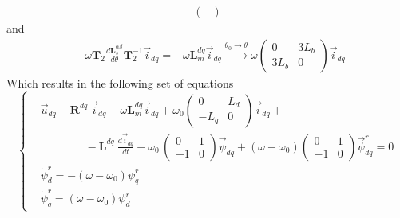 \documentclass[12pt,a4paper,oneside]{book}
\begin{document}
\begin{onehalfspace}
\begin{equation}
\begin{aligned}
\begin{pmatrix}
		\end{pmatrix}
	\end{aligned}
\end{equation}
and
\begin{equation}
	\begin{aligned}
		&-\omega\mathbf{T}_2\frac{d\mathbf{L}_s^{\alpha\beta}}{d\theta}\mathbf{T}_2^{-1}\vec{i}_{dq}
		= -\omega\mathbf{L}_m^{dq}\vec{i}_{dq}
		\xrightarrow{\theta_0\rightarrow\theta} \omega\begin{pmatrix} 0 & 
			3L_b\\ 3L_b & 0 \end{pmatrix}\vec{i}_{dq}\		
	\end{aligned}
\end{equation}
Which results in the following set of equations
\begin{equation*}
	\left\lbrace \begin{aligned}
		& \vec{u}_{dq}-\mathbf{R}^{dq}\ \vec{i}_{dq} 
		-\omega\mathbf{L}_m^{dq}\vec{i}_{dq} + \omega_0\begin{pmatrix} 0 & 
			L_d\\ -L_q & 0 \end{pmatrix}\vec{i}_{dq} + \\[6pt] 
		&\qquad\qquad-\mathbf{L}^{dq}\ \frac{d\vec{i}_{dq}}{dt} + 
		\omega_0\,\begin{pmatrix} 0 & 1\\ -1 & 0 
		\end{pmatrix}\vec{\psi}_{dq} + (\omega - \omega_0)\begin{pmatrix} 0 
			& 1\\ -1 & 0 \end{pmatrix}\vec{\psi}_{dq}^r = 0\\[6pt]
		& \dot{\psi}_d^r = -\left( \omega-\omega_0\right)\psi_q^r \\[6pt]
		&\dot{\psi}_q^r = \left( \omega-\omega_0\right)\psi_d^r

\end{aligned}
\end{equation*}
\end{onehalfspace}
\end{document}
